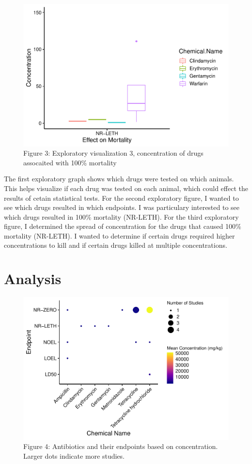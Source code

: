 \documentclass[12pt,]{article}
\begin{document}
\begin{figure}
\centering
\includegraphics{Reents_ENV872L_Project_files/figure-latex/exploratory 3-1.pdf}
\caption{Figure 3: Exploratory visualization 3, concentration of drugs
assocaited with 100\% mortality}
\end{figure}

The first exploratory graph shows which drugs were tested on which
animals. This helps visualize if each drug was tested on each animal,
which could effect the results of cetain statistical tests. For the
second exploratory figure, I wanted to see which drugs resulted in which
endpoints. I was particulary interested to see which drugs resulted in
100\% mortality (NR-LETH). For the third exploratory figure, I
determined the spread of concentration for the drugs that caused 100\%
mortality (NR-LETH). I wanted to determine if certain drugs required
higher concentrations to kill and if certain drugs killed at multiple
concentrations.

\newpage

\section{Analysis}\label{analysis}

\begin{figure}
\centering
\includegraphics{Reents_ENV872L_Project_files/figure-latex/visualization 1-1.pdf}
\caption{Figure 4: Antibiotics and their endpoints based on
concentration. Larger dots indicate more studies.}
\end{figure}
\end{document}
